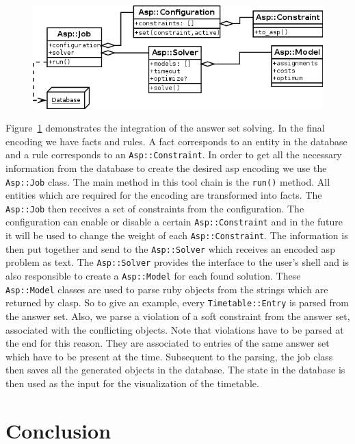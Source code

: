 \documentclass[12pt]{article} %
\newcommand{\job}{\texttt{Asp::Job}}
\newcommand{\model}{\texttt{Asp::Model}}
\newcommand{\solver}{\texttt{Asp::Solver}}
\newcommand{\constraint}{\texttt{Asp::Constraint}}
\newcommand{\entry}{\texttt{Timetable::Entry}}
\newcommand{\run}{\texttt{run()}}
\begin{document}
\begin{figure}[h]
    \includegraphics[width=\textwidth]{Images/AspClassDiagram.png}
    \label{fig:class_diagram}
\end{figure}

Figure~\ref{fig:class_diagram} demonstrates the integration of the answer set solving.
In the final encoding we have facts and rules.
A fact corresponds to an entity in the database and a rule corresponds to an \constraint{}.
In order to get all the necessary information from the database to create the desired asp encoding we use the \job{} class.
The main method in this tool chain is the \run{} method.
All entities which are required for the encoding are transformed into facts.
The \job{} then receives a set of constraints from the configuration.
The configuration can enable or disable a certain \constraint{} and in the future it will be used to change the weight of each \constraint{}.
The information is then put together and send to the \solver{} which receives an encoded asp problem as text.
The \solver{} provides the interface to the user's shell and is also responsible to create a \model{} for each found solution.
These \model{} classes are used to parse ruby objects from the strings which are returned by clasp.
So to give an example, every \entry{} is parsed from the answer set.
Also, we parse a violation of a soft constraint from the answer set, associated with the conflicting objects.
Note that violations have to be parsed at the end for this reason.
They are associated to entries of the same answer set which have to be present at the time.
Subsequent to the parsing, the job class then saves all the generated objects in the database.
The state in the database is then used as the input for the visualization of the timetable.

\section{Conclusion}






\end{document}
